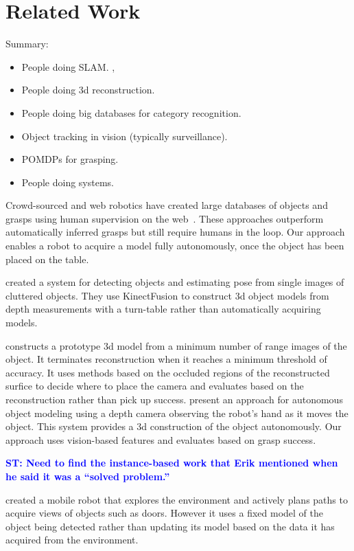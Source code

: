\documentclass[conference]{IEEEtran}
\newcommand{\stnote}[1]{\textcolor{Blue}{\textbf{ST: #1}}}
\begin{document}
\section{Related Work}


Summary: 
\begin{itemize}
\item People doing SLAM.  \citet{wang07, gallagher09}, 
\item People doing 3d reconstruction.   \citet{krainin11, banta00}
\item People doing big databases for category recognition.  \citet{kent14a, kent14, lai11a, goldfeder09}
\item Object tracking in vision (typically surveillance).
\item POMDPs for grasping.  \citet{platt11, hsiao10}
\item People doing systems.  \citet{hudson12, ciocarlie14}
\end{itemize}


Crowd-sourced and web robotics have created large databases of objects
and grasps using human supervision on the web~\citep{kent14a, kent14}.
These approaches outperform automatically inferred grasps but still
require humans in the loop.  Our approach enables a robot to acquire a
model fully autonomously, once the object has been placed on the
table.

\citet{zhu14} created a system for detecting objects and estimating
pose from single images of cluttered objects.  They use KinectFusion
to construct 3d object models from depth measurements with a
turn-table rather than automatically acquiring models.


\citet{banta00} constructs a prototype 3d model from a minimum number
of range images of the object.  It terminates reconstruction when it
reaches a minimum threshold of accuracy.  It uses methods based on the
occluded regions of the reconstructed surfice to decide where to place
the camera and evaluates based on the reconstruction rather than pick
up success.  \citet{krainin11} present an approach for autonomous
object modeling using a depth camera observing the robot's hand as it
moves the object.  This system provides a 3d construction of the
object autonomously.  Our approach uses vision-based features and
evaluates based on grasp success.

\stnote{Need to find the instance-based work that Erik mentioned when
  he said it was a ``solved problem.''}

\citet{velez11} created a mobile robot that explores the environment
and actively plans paths to acquire views of objects such as doors.
However it uses a fixed model of the object being detected rather than
updating its model based on the data it has acquired from the
environment.
\end{document}
